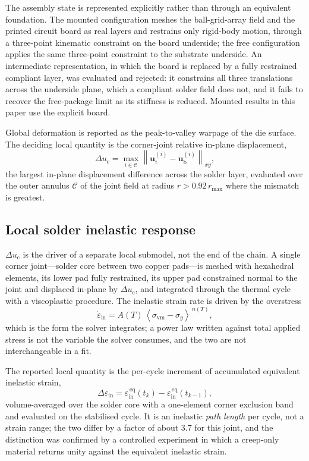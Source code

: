 \documentclass[journal]{IEEEtran}
\begin{document}
The assembly state is represented explicitly rather than through an equivalent foundation.
The mounted configuration meshes the ball-grid-array field and the printed circuit board as
real layers and restrains only rigid-body motion, through a three-point kinematic
constraint on the board underside; the free configuration applies the same three-point
constraint to the substrate underside. An intermediate representation, in which the board
is replaced by a fully restrained compliant layer, was evaluated and rejected: it constrains
all three translations across the underside plane, which a compliant solder field does not,
and it fails to recover the free-package limit as its stiffness is reduced. Mounted results
in this paper use the explicit board.

Global deformation is reported as the peak-to-valley warpage of the die surface. The
deciding local quantity is the corner-joint relative in-plane displacement,
\begin{equation}
\Delta u_{\mathrm{c}} = \max_{i \in \mathcal{C}}
 \left\| \mathbf{u}_{\mathrm{t}}^{(i)} - \mathbf{u}_{\mathrm{b}}^{(i)} \right\|_{xy},
\label{eq:duc}
\end{equation}
the largest in-plane displacement difference across the solder layer, evaluated over the
outer annulus $\mathcal{C}$ of the joint field at radius $r > 0.92\,r_{\max}$ where the
mismatch is greatest.

\subsection{Local solder inelastic response}
$\Delta u_{\mathrm{c}}$ is the driver of a separate local submodel, not the end of the chain.
A single corner joint---solder core between two copper pads---is meshed with hexahedral
elements, its lower pad fully restrained, its upper pad constrained normal to the joint and
displaced in-plane by $\Delta u_{\mathrm{c}}$, and integrated through the thermal cycle with
a viscoplastic procedure. The inelastic strain rate is driven by the overstress
\begin{equation}
\dot{\varepsilon}_{\mathrm{in}} =
A(T)\,\left\langle \sigma_{\mathrm{vm}} - \sigma_{y} \right\rangle^{\,n(T)},
\label{eq:creep}
\end{equation}
which is the form the solver integrates; a power law written against total applied stress is
not the variable the solver consumes, and the two are not interchangeable in a fit.

The reported local quantity is the per-cycle increment of accumulated equivalent inelastic
strain,
\begin{equation}
\Delta\varepsilon_{\mathrm{in}} = \varepsilon^{\,\mathrm{eq}}_{\mathrm{in}}(t_{k})
 - \varepsilon^{\,\mathrm{eq}}_{\mathrm{in}}(t_{k-1}),
\label{eq:resp}
\end{equation}
volume-averaged over the solder core with a one-element corner exclusion band and evaluated
on the stabilised cycle. It is an inelastic \emph{path length} per cycle, not a strain range;
the two differ by a factor of about $3.7$ for this joint, and the distinction was confirmed
by a controlled experiment in which a creep-only material returns unity against the
equivalent inelastic strain.
\end{document}
